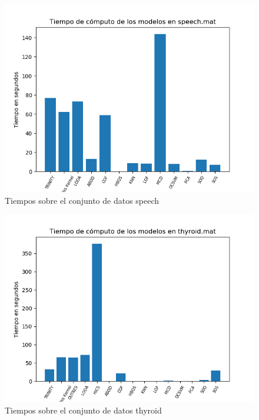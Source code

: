 \begin{figure}[H]
	\centering
	\includegraphics[scale=0.7]{imagenes/imgs-exp1/times/speech}
	\caption{Tiempos sobre el conjunto de datos speech}
	\label{speech_times}
\end{figure}

\begin{figure}[H]
	\centering
	\includegraphics[scale=0.7]{imagenes/imgs-exp1/times/thyroid}
	\caption{Tiempos sobre el conjunto de datos thyroid}
	\label{thyroid_times}
\end{figure}

